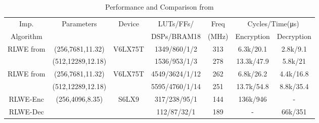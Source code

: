 \documentclass[10pt,journal]{article}
\begin{document}
\begin{table}[ht]
\centering
\caption{Performance and Comparison from \cite{Roy2014}}
\begin{tabular}{|c|c|c|c|c|c|c|}
\hline
Imp. & Parameters        & Device  & LUTs/FFs/      & Freq  & \multicolumn{2}{c|}{Cycles/Time(μs)} \\
Algorithm      &                   &         & DSPs/BRAM18    & (MHz) & Encryption        & Decryption       \\ \hline
RLWE from \cite{Roy2014}      & (256,7681,11.32)  & V6LX75T & 1349/860/1/2   & 313   & 6.3k/20.1         & 2.8k/9.1         \\
     & (512,12289,12.18) &         & 1536/953/1/3   & 278   & 13.3k/47.9        & 5.8k/21          \\ \hline
RLWE from \cite{Poppelmann2014}       & (256,7681,11.32)  & V6LX75T & 4549/3624/1/12 & 262   & 6.8k/26.2         & 4.4k/16.8        \\
       & (512,12289,12.18) &         & 5595/4760/1/14 & 251   & 13.7k/54.8        & 8.8k/35.4        \\ \hline
RLWE-Enc  \cite{Poppelmann20142}             & (256,4096,8.35)   & S6LX9   & 317/238/95/1   & 144   & 136k/946          & -                \\
RLWE-Dec               &                   &         & 112/87/32/1    & 189   & -                 & 66k/351          \\ \hline
\end{tabular}
\end{table}







\end{document}
